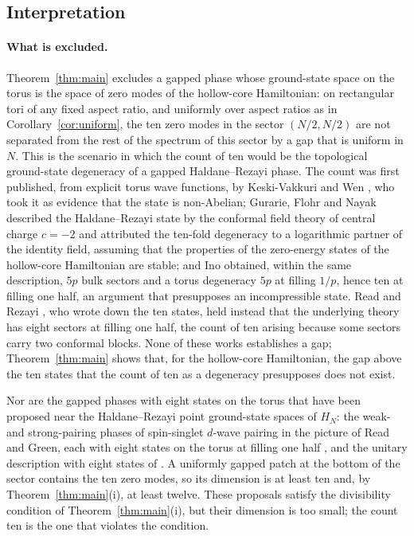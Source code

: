 \subsection{Interpretation}\label{subsec:interpretation}

\paragraph{What is excluded.}
Theorem~\ref{thm:main} excludes a gapped phase whose ground-state space on the torus is the space of zero modes of the
hollow-core Hamiltonian: on rectangular tori of any fixed aspect ratio, and uniformly over aspect ratios as in
Corollary~\ref{cor:uniform}, the ten zero modes in the sector $(N/2,N/2)$ are not separated from the rest of the
spectrum of this sector by a gap that is uniform in $N$. This is the scenario in which the count of ten would be the
topological ground-state degeneracy of a gapped Haldane--Rezayi phase. The count was first published, from explicit
torus wave functions, by Keski-Vakkuri and Wen \cite{KVW93}, who took it as evidence that the state is non-Abelian;
Gurarie, Flohr and Nayak \cite{GFN97} described the Haldane--Rezayi state by the conformal field theory of central
charge $c=-2$ and attributed the ten-fold degeneracy to a logarithmic partner of the identity field, assuming that the
properties of the zero-energy states of the hollow-core Hamiltonian are stable; and Ino \cite{Ino99} obtained, within
the same description, $5p$ bulk sectors and a torus degeneracy $5p$ at filling $1/p$, hence ten at filling one half, an
argument that presupposes an incompressible state. Read and Rezayi \cite[Section~V]{RR96}, who wrote down the ten
states, held instead that the underlying theory has eight sectors at filling one half, the count of ten arising because
some sectors carry two conformal blocks.
None of these works establishes a gap; Theorem~\ref{thm:main} shows that, for the hollow-core Hamiltonian, the gap above
the ten states that the count of ten as a degeneracy presupposes does not exist.

Nor are the gapped phases with eight states on the torus that have been proposed near the Haldane--Rezayi point
ground-state spaces of $H_N$: the weak- and strong-pairing phases of spin-singlet $d$-wave pairing in the picture of
Read and Green, each with eight states on the torus at filling one half \cite{RG00}, and the unitary description with
eight states of \cite{CGT99}. A uniformly gapped patch at the bottom of the sector contains the ten zero modes, so its
dimension is at least ten and, by Theorem~\ref{thm:main}(i), at least twelve. These proposals satisfy the divisibility
condition of Theorem~\ref{thm:main}(i), but their dimension is too small; the count ten is the one that violates the
condition.

